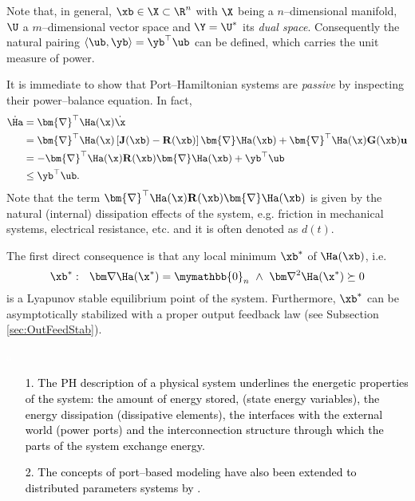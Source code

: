 %
Note that, in general, $\xb\in\X\subset\R^n$ with $\X$ being a $n$--dimensional manifold, $\U$ a $m$--dimensional vector space and $\Y = \U^*$ its \textit{dual space}. Consequently the natural pairing $\langle\ub,\yb\rangle = \yb^\top\ub$ can be defined, which carries the unit measure of power.
%
\newline

%
It is immediate to show that Port--Hamiltonian systems are \textit{passive} by inspecting their power--balance equation. In fact,
%
\begin{align}
    \dot{\Ha} &= \bm{\nabla}^\top\Ha(\x)\dot{\x} \\
              &= \bm{\nabla}^\top\Ha(\x)\left[\mathbf{J}(\xb) - \mathbf{R}(\xb)\right]\bm{\nabla}\Ha(\xb) + \bm{\nabla}^\top\Ha(\x)\mathbf{G}(\xb)\mathbf{u} \\
              &= -\bm{\nabla}^\top\Ha(\x)\mathbf{R}(\xb)\bm{\nabla}\Ha(\xb) + \yb^\top\ub \\
              &\leq \yb^\top\ub.
\end{align}
%
Note that the term $\bm{\nabla}^\top\Ha(\x)\mathbf{R}(\xb)\bm{\nabla}\Ha(\xb)$ is given by the natural (internal) dissipation effects of the system, e.g. friction in mechanical systems, electrical resistance, etc. and it is often denoted as $d(t)$.
%

%
The first direct consequence is that any local minimum $\xb^*$ of $\Ha(\xb)$, i.e.
\begin{equation}
    \xb^*:~~\bm\nabla\Ha(\x^*) = \mymathbb{0}_n~\land~\bm\nabla^2\Ha(\x^*)\succeq 0
\end{equation}
is a Lyapunov stable equilibrium point of the system. Furthermore, $\xb^*$ can be asymptotically stabilized with a proper output feedback law (see Subsection \ref{sec:OutFeedStab}).
%
\textcolor{black}{
\begin{rem}\textcolor{white}{a}
    \begin{itemize}
	\item [1.] The PH description of a physical system underlines the energetic properties of the system: the amount of energy stored, (state energy variables), the energy dissipation (dissipative elements), the interfaces with the external world (power ports) and the interconnection structure through which the parts of the system exchange energy.
	\item [2.] The concepts of port--based modeling have also been extended to distributed parameters systems by \cite{MASCHKE200027,maschke2001hamiltonian} \cite{rodriguez2001stabilization,macchelli2003port,macchelli2004modeling,macchelli2004port2,macchelli2004port}.
    \end{itemize}
\end{rem}}


